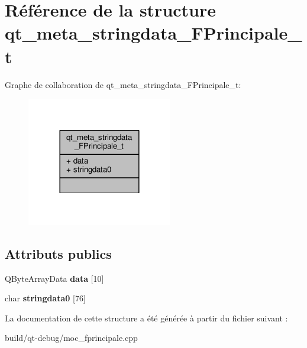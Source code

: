 \hypertarget{structqt__meta__stringdata__FPrincipale__t}{}\section{Référence de la structure qt\+\_\+meta\+\_\+stringdata\+\_\+\+F\+Principale\+\_\+t}
\label{structqt__meta__stringdata__FPrincipale__t}


Graphe de collaboration de qt\+\_\+meta\+\_\+stringdata\+\_\+\+F\+Principale\+\_\+t\+:
\nopagebreak
\begin{figure}[H]
\begin{center}
\leavevmode
\includegraphics[width=180pt]{structqt__meta__stringdata__FPrincipale__t__coll__graph}
\end{center}
\end{figure}
\subsection*{Attributs publics}
\begin{DoxyCompactItemize}
\item 
Q\+Byte\+Array\+Data {\bfseries data} \mbox{[}10\mbox{]}\hypertarget{structqt__meta__stringdata__FPrincipale__t_aa2d48a9ce6ba7ef9a16aded4c38c110f}{}\label{structqt__meta__stringdata__FPrincipale__t_aa2d48a9ce6ba7ef9a16aded4c38c110f}

\item 
char {\bfseries stringdata0} \mbox{[}76\mbox{]}\hypertarget{structqt__meta__stringdata__FPrincipale__t_ada283646f5010ad2c36427fdef9946c3}{}\label{structqt__meta__stringdata__FPrincipale__t_ada283646f5010ad2c36427fdef9946c3}

\end{DoxyCompactItemize}


La documentation de cette structure a été générée à partir du fichier suivant \+:\begin{DoxyCompactItemize}
\item 
build/qt-\/debug/moc\+\_\+fprincipale.\+cpp\end{DoxyCompactItemize}
